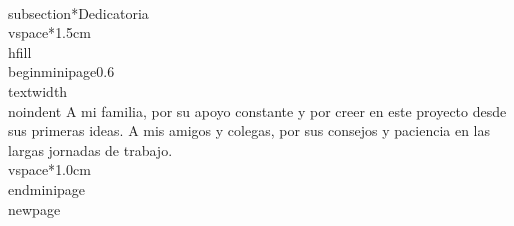 \\subsection*{Dedicatoria}
\\vspace*{1.5cm}
{\\hfill
    \\begin{minipage}{0.6\\textwidth}
        \\noindent
        A mi familia, por su apoyo constante y por creer en este proyecto desde sus primeras ideas. A mis amigos y colegas, por sus consejos y paciencia en las largas jornadas de trabajo.
        \\vspace*{1.0cm}
    \\end{minipage}
}
\\newpage